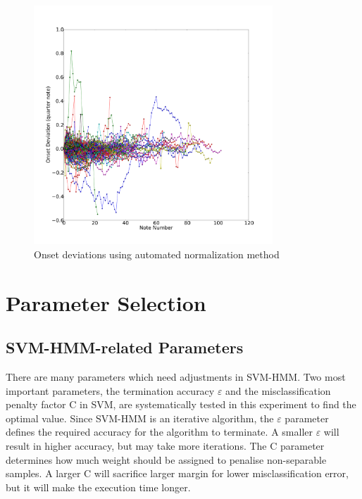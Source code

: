 
\begin{figure}[tp]
   \begin{center}
      \includegraphics[width=0.8\textwidth]{fig/lian_onset_1}
   \end{center}
   \caption{Onset deviations using automated normalization method}
   \label{fig:normauto}
\end{figure}


\section{Parameter Selection}
\label{sec:paramselect}
\subsection{SVM-HMM-related Parameters}
There are many parameters which need adjustments in SVM-HMM. Two most important parameters, the termination accuracy $\varepsilon$ and the misclassification penalty factor C in SVM, are systematically tested in this experiment to find the optimal value. Since SVM-HMM is an iterative algorithm, the $\varepsilon$ parameter defines the required accuracy for the algorithm to terminate. A smaller $\varepsilon$ will result in higher accuracy, but may take more iterations. The C parameter determines how much weight should be assigned to penalise non-separable samples. A larger C will sacrifice larger margin for lower misclassification error, but it will make the execution time longer.%

